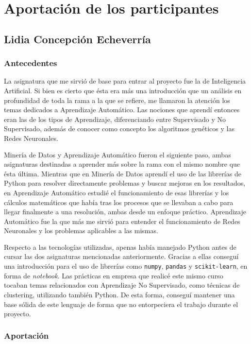 \chapter{Aportación de los participantes}

\section{Lidia Concepción Echeverría}
\subsection{Antecedentes}

La asignatura que me sirvió de base para entrar al proyecto fue la de Inteligencia Artificial. Si bien es cierto que ésta era más una introducción que un análisis en profundidad de toda la rama a la que se refiere, me llamaron la atención los temas dedicados a Aprendizaje Automático. Las nociones que aprendí entonces eran las de los tipos de Aprendizaje, diferenciando entre Supervisado y No Supervisado, además de conocer como concepto los algoritmos genéticos y las Redes Neuronales. 

Minería de Datos y Aprendizaje Automático fueron el siguiente paso, ambas asignaturas destinadas a aprender más sobre la rama con el mismo nombre que ésta última. Mientras que en Minería de Datos aprendí el uso de las librerías de Python para resolver directamente problemas y buscar mejoras en los resultados, en Aprendizaje Automático estudié el funcionamiento de esas librerías y los cálculos matemáticos que había tras los procesos que se llevaban a cabo para llegar finalmente a una resolución, ambas desde un enfoque práctico. Aprendizaje Automático fue la que más me sirvió para entender el funcionamiento de Redes Neuronales y los problemas aplicables a las mismas. 

Respecto a las tecnologías utilizadas, apenas había manejado Python antes de cursar las dos asignaturas mencionadas anteriormente. Gracias a ellas conseguí una introducción para el uso de librerías como \texttt{numpy}, \texttt{pandas} y \texttt{scikit-learn}, en forma de \textit{notebook}. Las prácticas en empresa que realicé este mismo curso tocaban temas relacionados con Aprendizaje No Supervisado, como técnicas de clustering, utilizando también Python. De esta forma, conseguí mantener una base sólida de este lenguaje de forma que no entorpeciera el trabajo durante el proyecto.

\subsection{Aportación}

